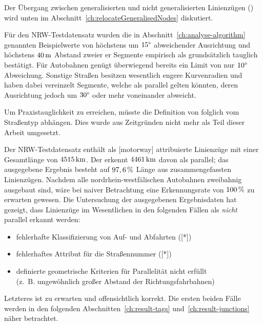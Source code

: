 \documentclass[../main/thesis.tex]{subfiles}
\begin{document}
Der Übergang zwischen generalisierten und nicht generalisierten Linienzügen () wird unten im Abschnitt~\ref{ch:relocateGeneralisedNodes} diskutiert.

Für den NRW-Testdatensatz wurden die in Abschnitt~\ref{ch:analyse-algorithm} genannten Beispielwerte von höchstens um $15\degree$ abweichender Ausrichtung und höchstens $\unit[40]{m}$ Abstand zweier er Segmente empirisch als grundsätzlich tauglich bestätigt.
Für Autobahnen genügt überwiegend bereits ein Limit von nur $10\degree$ Abweichung.
Sonstige Straßen besitzen wesentlich engere Kurvenradien und haben dabei vereinzelt Segmente, welche als parallel gelten könnten, deren Ausrichtung jedoch um $30\degree$ oder mehr voneinander abweicht.



Um Praxistauglichkeit zu erreichen, müsste die Definition von  folglich vom Straßentyp abhängen.
Dies wurde aus Zeitgründen nicht mehr als Teil dieser Arbeit umgesetzt.

Der NRW-Testdatensatz enthält als [motorway] attribuierte Linienzüge mit einer Gesamtlänge von $\unit[4515]{km}$.
Der  erkennt $\unit[4461]{km}$ davon als parallel; das ausgegebene Ergebnis besteht auf $\unit[97,6]{\%}$ Länge aus zusammengefassten Linienzügen.
Nachdem alle nordrhein-westfälischen Autobahnen zweibahnig ausgebaut sind, wäre bei naiver Betrachtung eine Erkennungsrate von $\unit[100]{\%}$ zu erwarten gewesen.
Die Untersuchung der ausgegebenen Ergebnisdaten hat gezeigt, dass Linienzüge im Wesentlichen in den folgenden Fällen als \emph{nicht} parallel erkannt werden:

\begin{itemize}[nosep]
\item fehlerhafte Klassifizierung von Auf- und Abfahrten ([*])
\item fehlerhaftes Attribut für die Straßennummer ([*])
\item definierte geometrische Kriterien für Parallelität nicht erfüllt \\(z.~B. ungewöhnlich großer Abstand der Richtungsfahrbahnen)
\end{itemize}
%
Letzteres ist zu erwarten und offensichtlich korrekt.
Die ersten beiden Fälle werden in den folgenden Abschnitten~\ref{ch:result-tags} und~\ref{ch:result-junctions} näher betrachtet.
\end{document}
